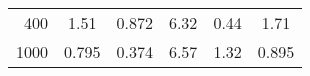 \begin{table}[h]
\begin{tabular}{r c c c c c}
        400 & 1.51   & 0.872  & 6.32   & 0.44   & 1.71   \\
        1000 & 0.795 & 0.374  & 6.57   & 1.32   & 0.895  \\
        \bottomrule
    \end{tabular}
\end{table}

